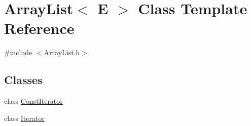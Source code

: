 \hypertarget{class_array_list}{
\section{ArrayList$<$ E $>$ Class Template Reference}
\label{class_array_list}
}


{\ttfamily \#include $<$ArrayList.h$>$}

\subsection*{Classes}
\begin{DoxyCompactItemize}
\item 
class \hyperlink{class_array_list_1_1_const_iterator}{ConstIterator}
\item 
class \hyperlink{class_array_list_1_1_iterator}{Iterator}
\end{DoxyCompactItemize}
